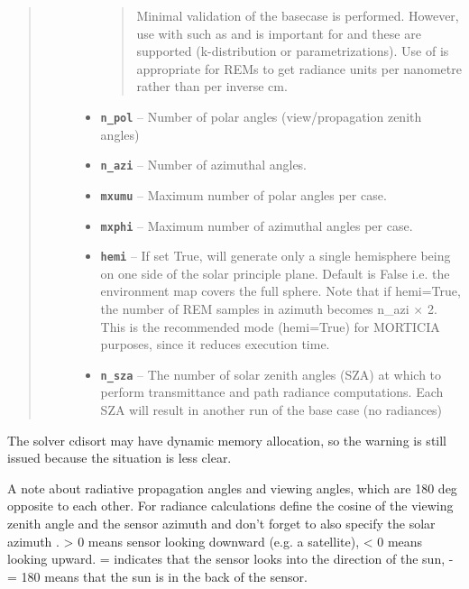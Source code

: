 \documentclass[a4paper,10pt,english]{sphinxmanual}
\begin{document}
\begin{fulllineitems}
\begin{fulllineitems}
\begin{quote}
\begin{description}
\begin{itemize}
\begin{quote}
Minimal validation of the basecase is performed. However, use with  such as  and
 is important for  and these are supported (k-distribution or 
parametrizations). Use of  is appropriate for  REMs to get
radiance units per nanometre rather than per inverse cm.
\end{quote}


\item {} 
\textbf{\texttt{n\_pol}} -- Number of polar angles (view/propagation zenith angles)

\item {} 
\textbf{\texttt{n\_azi}} -- Number of azimuthal angles.

\item {} 
\textbf{\texttt{mxumu}} -- Maximum number of polar angles per case.

\item {} 
\textbf{\texttt{mxphi}} -- Maximum number of azimuthal angles per case.

\item {} 
\textbf{\texttt{hemi}} -- If set True, will generate only a single hemisphere being on one side of
the solar principle plane. Default is False i.e. the environment map covers the full sphere.
Note that if hemi=True, the number of REM samples in azimuth becomes n\_azi \(\times\) 2.
This is the recommended mode (hemi=True) for MORTICIA purposes, since it reduces execution time.

\item {} 
\textbf{\texttt{n\_sza}} -- The number of solar zenith angles (SZA) at which to perform transmittance and path radiance
computations. Each SZA will result in another run of the base case (no radiances)

\end{itemize}

\end{description}\end{quote}

The solver cdisort may have dynamic memory allocation, so the warning is still issued because the situation
is less clear.

A note about radiative propagation angles and viewing angles, which are 180 deg opposite to each other.
For radiance calculations define the cosine of the viewing zenith angle
 and the sensor azimuth  and don't forget to also specify the solar azimuth
.  \textgreater{} 0 means sensor looking downward (e.g. a satellite),  \textless{} 0 means looking
upward.  =  indicates that the sensor looks into the direction of the sun,
 -  = 180 means that the sun is in the back of the sensor.


\end{fulllineitems}
\end{fulllineitems}
\end{document}
